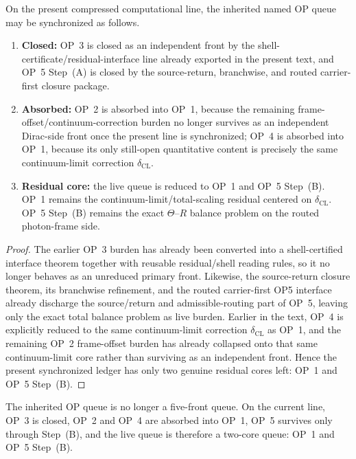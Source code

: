 \begin{proposition}
On the present compressed computational line, the inherited named OP queue may be synchronized as follows.
\begin{enumerate}[leftmargin=2em]
 \item \textbf{Closed:} OP~3 is closed as an independent front by the shell-certificate/residual-interface line already exported in the present text, and OP~5 Step~(A) is closed by the source-return, branchwise, and routed carrier-first closure package.
 \item \textbf{Absorbed:} OP~2 is absorbed into OP~1, because the remaining frame-offset/continuum-correction burden no longer survives as an independent Dirac-side front once the present line is synchronized; OP~4 is absorbed into OP~1, because its only still-open quantitative content is precisely the same continuum-limit correction \(\delta_{\mathrm{CL}}\).
 \item \textbf{Residual core:} the live queue is reduced to OP~1 and OP~5 Step~(B). OP~1 remains the continuum-limit/total-scaling residual centered on \(\delta_{\mathrm{CL}}\). OP~5 Step~(B) remains the exact \(\Theta\)--\(R\) balance problem on the routed photon-frame side.
\end{enumerate}
\end{proposition}

\begin{proof}
The earlier OP~3 burden has already been converted into a shell-certified interface theorem together with reusable residual/shell reading rules, so it no longer behaves as an unreduced primary front. Likewise, the source-return closure theorem, its branchwise refinement, and the routed carrier-first OP5 interface already discharge the source/return and admissible-routing part of OP~5, leaving only the exact total balance problem as live burden. Earlier in the text, OP~4 is explicitly reduced to the same continuum-limit correction \(\delta_{\mathrm{CL}}\) as OP~1, and the remaining OP~2 frame-offset burden has already collapsed onto that same continuum-limit core rather than surviving as an independent front. Hence the present synchronized ledger has only two genuine residual cores left: OP~1 and OP~5 Step~(B).
\end{proof}

\begin{corollary}
The inherited OP queue is no longer a five-front queue. On the current line, OP~3 is closed, OP~2 and OP~4 are absorbed into OP~1, OP~5 survives only through Step~(B), and the live queue is therefore a two-core queue: OP~1 and OP~5 Step~(B).
\end{corollary}

